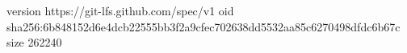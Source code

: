version https://git-lfs.github.com/spec/v1
oid sha256:6b848152d6e4dcb22555bb3f2a9cfec702638dd5532aa85c6270498dfdc6b67c
size 262240

